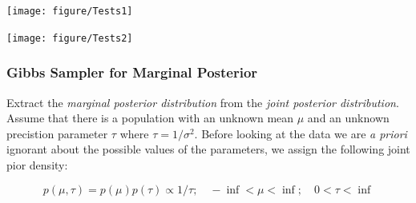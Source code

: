 \documentclass[12pt, a4paper, oneside]{article} %
\begin{document}
\begin{knitrout}
\color{fgcolor}\begin{kframe}
\begin{alltt}
\end{alltt}
\end{kframe}
\texttt{[image: figure/Tests1]} 
\begin{kframe}\begin{alltt}
\end{alltt}
\end{kframe}
\texttt{[image: figure/Tests2]} 
\begin{kframe}\begin{alltt}
\end{alltt}


{\ttfamily\noindent\bfseries\color{errorcolor}{\#\# Error: there is no package called 'tseries'}}\begin{alltt}
\end{alltt}


{\ttfamily\noindent\bfseries{}}\begin{alltt}
\end{alltt}


{\ttfamily\noindent\bfseries{}}\end{kframe}
\end{knitrout}

\subsubsection{Gibbs Sampler for Marginal Posterior}
Extract the \emph{marginal posterior distribution} from the \emph{joint posterior distribution}. Assume that there is a population with an unknown mean $\mu$ and an unknown precistion parameter $\tau$ where $\tau = 1/\sigma^2$. Before looking at the data we are \emph{a priori} ignorant about the possible values of the parameters, we assign the following joint pior density: 

\begin{equation}
p(\mu, \tau) = p(\mu) p(\tau) \propto 1/\tau ; \quad -\inf < \mu < \inf ; \quad 0 < \tau < \inf
\end{equation}
\end{document}
